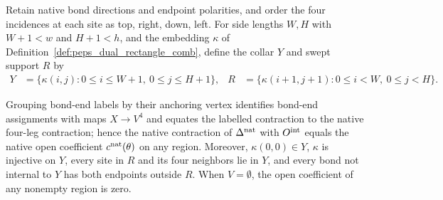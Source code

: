 \begin{definition}
    \label{def:peps_dual_collar}
    \leanok
    Retain native bond directions and endpoint polarities, and order the four
    incidences at each site as top, right, down, left. For side lengths
    $W,H$ with $W+1<w$ and $H+1<h$, and the embedding $\kappa$ of
    Definition~\ref{def:peps_dual_rectangle_comb}, define the collar $Y$ and
    swept support $R$ by
    \begin{align}
        Y & =\{\kappa(i,j):0\leq i\leq W+1,\ 0\leq j\leq H+1\}, &
        R & =\{\kappa(i+1,j+1):0\leq i<W,\ 0\leq j<H\}.
        \label{eq:peps_dual_collar_sets}
    \end{align}
\end{definition}
\begin{lemma}
    \label{thm:peps_dual_collar_geometry}
    \leanok
    Grouping bond-end labels by their anchoring vertex identifies bond-end
    assignments with maps $X\to V^4$ and equates the labelled contraction to
    the native four-leg contraction; hence the native contraction of
    $\Delta^{\rm nat}$ with $O^{\rm int}$ equals the native open coefficient
    $c^{\rm nat}(\theta)$ on any region. Moreover, $\kappa(0,0)\in Y$, $\kappa$
    is injective on $Y$, every site in $R$ and its four neighbors lie in $Y$,
    and every bond not internal to $Y$ has both endpoints outside $R$. When
    $V=\emptyset$, the open coefficient of any nonempty region is zero.
\end{lemma}
